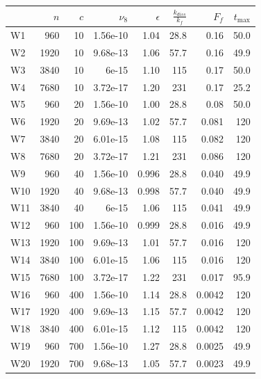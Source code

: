 \begin{table}
\begin{center}


\begin{tabular}{lrrrrrrr}
\toprule
{} &   $n$ &  $c$ &  $\nu_8$ &  $\epsilon$ &  $\frac{k_{diss}}{k_f}$ &   $F_f$ &  $t_{\max}$ \\
\midrule
W1  &   960 &   10 & 1.56e-10 &        1.04 &                    28.8 &   0.16 &          50.0 \\
W2  &  1920 &   10 & 9.68e-13 &        1.06 &                    57.7 &   0.16 &        49.9 \\
W3  &  3840 &   10 &    6e-15 &         1.10 &                     115 &   0.17 &          50.0 \\
W4  &  7680 &   10 & 3.72e-17 &         1.20 &                     231 &   0.17 &        25.2 \\
W5  &   960 &   20 & 1.56e-10 &           1.00 &                    28.8 &  0.08 &          50.0 \\
W6  &  1920 &   20 & 9.69e-13 &        1.02 &                    57.7 &  0.081 &         120 \\
W7  &  3840 &   20 & 6.01e-15 &        1.08 &                     115 &  0.082 &         120 \\
W8  &  7680 &   20 & 3.72e-17 &        1.21 &                     231 &  0.086 &         120 \\
W9  &   960 &   40 & 1.56e-10 &       0.996 &                    28.8 &  0.040 &        49.9 \\
W10 &  1920 &   40 & 9.68e-13 &       0.998 &                    57.7 &  0.040 &        49.9 \\
W11 &  3840 &   40 &    6e-15 &        1.06 &                     115 &  0.041 &        49.9 \\
W12 &   960 &  100 & 1.56e-10 &       0.999 &                    28.8 &  0.016 &        49.9 \\
W13 &  1920 &  100 & 9.69e-13 &        1.01 &                    57.7 &  0.016 &         120 \\
W14 &  3840 &  100 & 6.01e-15 &        1.06 &                     115 &  0.016 &         120 \\
W15 &  7680 &  100 & 3.72e-17 &        1.22 &                     231 &  0.017 &        95.9 \\
W16 &   960 &  400 & 1.56e-10 &        1.14 &                    28.8 &  0.0042 &         120 \\
W17 &  1920 &  400 & 9.69e-13 &        1.15 &                    57.7 & 0.0042 &         120 \\
W18 &  3840 &  400 & 6.01e-15 &        1.12 &                     115 & 0.0042 &         120 \\
W19 &   960 &  700 & 1.56e-10 &        1.27 &                    28.8 & 0.0025 &        49.9 \\
W20 &  1920 &  700 & 9.68e-13 &        1.05 &                    57.7 & 0.0023 &        49.9 \\
\bottomrule
\end{tabular}



\end{center}
\end{table}
